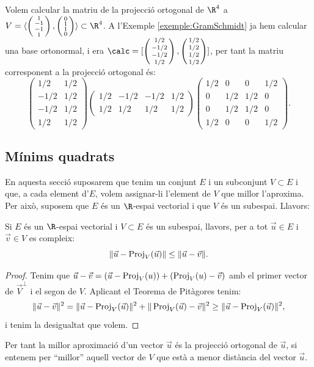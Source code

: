 \begin{exemple}
Volem calcular la matriu de la projecció ortogonal de $\R^4$ a $V=\langle \smat{1\\-1\\-1\\1}, \smat{0\\1\\1\\0}\rangle \subset \R^4$. A l'Exemple \ref{exemple:GramSchmidt} ja hem calcular una base ortonormal, i era  $\calc=[\smat{1/2\\-1/2\\-1/2\\1/2},\smat{1/2\\1/2\\1/2\\1/2}]$, per tant la matriu corresponent a la projecció ortogonal és:
\[
\begin{pmatrix}
1/2 & 1/2 \\ -1/2 & 1/2 \\ -1/2 & 1/2 \\ 1/2 & 1/2
\end{pmatrix}
\begin{pmatrix}
1/2 & -1/2 & -1/2 & 1/2 \\ 1/2 & 1/2 & 1/2 & 1/2 
\end{pmatrix}
\begin{pmatrix}
1/2 & 0 & 0 & 1/2 \\
0 & 1/2 & 1/2 & 0 \\
0 & 1/2 & 1/2 & 0 \\
1/2 & 0 & 0 & 1/2
\end{pmatrix}.
\]
\end{exemple}

\subsection{Mínims quadrats}
En aquesta secció suposarem que tenim un conjunt $E$ i un subconjunt $V\subset E$ i que, a cada element d'$E$, volem assignar-li l'element de $V$ que millor l'aproxima. Per això, suposem que $E$ és un $\R$-espai vectorial i que $V$ és un subespai. Llavors:
\begin{proposicio}\label{prop:proj_com_aprox}
Si $E$ és un $\R$-espai vectorial i $V \subset E$ és un subespai, llavors, per a tot $\vec u \in E$ i $\vec v\in V$ es compleix:
\[
\|\vec u - \operatorname{Proj}_V(\vec u)\| \leq \|\vec u - \vec v\|.
\]
\end{proposicio}
\begin{proof}
Tenim que $\vec u - \vec v = (\vec u - \operatorname{Proj}_V(u)) + (\operatorname{Proj}_V(u) - \vec v)$ amb el primer vector de $\vec V^\perp$ i el segon de $V$. Aplicant el Teorema de Pitàgores tenim:
\[
\|\vec u - \vec v\|^2= \|\vec u - \operatorname{Proj}_V(\vec u)\|^2 + \|\operatorname{Proj}_V(\vec u) - \vec v\|^2 \geq \|\vec u - \operatorname{Proj}_V(\vec u)\|^2 ,
\]
i tenim la desigualtat que volem.
\end{proof}
Per tant la millor aproximació d'un vector $\vec u$ és la projecció ortogonal de $\vec u$, si entenem per ``millor'' aquell vector de $V$ que està a menor distància del vector $\vec u$.

